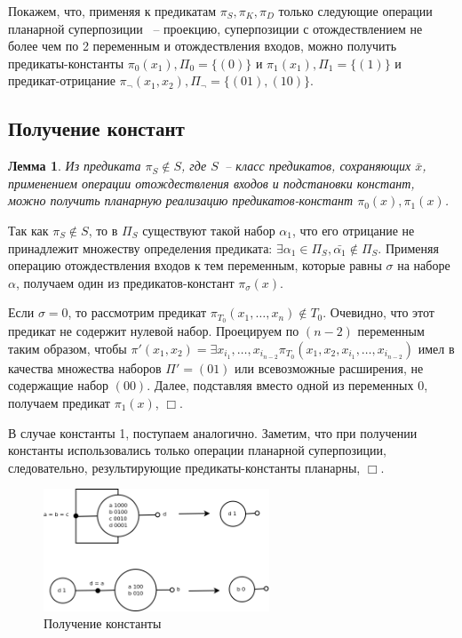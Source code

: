 \documentclass[12pt]{article}
\newtheorem{lemma}[theorem]{Лемма}
\newenvironment{proof}[1][Доказательство]{\begin{trivlist}
\item[\hskip \labelsep {\bfseries #1}]}{\end{trivlist}}
\begin{document}
Покажем, что, применяя к предикатам $\pi_S, \pi_K, \pi_D$ только следующие операции планарной суперпозиции ~-- проекцию,
суперпозиции с отождествлением не более чем по 2 переменным и отождествления входов, 
можно получить предикаты-константы
$\pi_0(x_1), \Pi_0=\{ (0) \}$ и $\pi_1(x_1), \Pi_1=\{ (1) \}$ и предикат-отрицание 
$\pi_{\neg}(x_1, x_2), \Pi_{\neg}=\{ (01), (10) \}$.

\subsection{Получение констант}
\begin{lemma}
\label{eq:const}
Из предиката $\pi_S \notin S$, где $S$~-- класс предикатов, сохраняющих $\bar{x}$, 
применением операции отождествления входов и подстановки констант,
можно получить планарную реализацию предикатов-констант $\pi_0(x), \pi_1(x)$.
\end{lemma}

\begin{proof}
Так как $\pi_S \notin S$, то в $\Pi_S$ существуют такой набор
$\alpha_1$, что его отрицание не принадлежит множеству определения предиката:
$\exists \alpha_1 \in \Pi_S, \bar{\alpha_1} \notin \Pi_S$.
Применяя операцию отождествления входов к тем переменным, которые равны $\sigma$ на наборе $\alpha$,
получаем один из предикатов-констант $\pi_{\sigma}(x)$.

Если $\sigma = 0$, то рассмотрим предикат 
$\pi_{T_0}(x_1, \dots, x_n) \notin T_0$. Очевидно, что этот предикат не содержит нулевой набор. 
Проецируем по $(n-2)$ переменным таким образом, чтобы 
$\pi'(x_1, x_2) = \exists {x_{i_1}, \dots, x_{i_{n-2}}} \pi_{T_0}(x_1, x_2, x_{i_1}, \dots, x_{i_{n-2}})$
имел в качества множества наборов $\Pi' = { (01) }$ или всевозможные расширения, не содержащие набор $(00)$.
Далее, подставляя вместо одной из переменных 0, получаем предикат $\pi_1(x)$, $\Box$. 

В случае константы 1, поступаем аналогично. 
Заметим, что при получении константы использовались только операции планарной суперпозиции, следовательно, 
результирующие предикаты-константы планарны, $\Box$.
\end{proof}
\begin{figure}[htb]
\centering
\includegraphics[width=0.6\textwidth]{const.png}
\caption{Получение константы}
\label{fig:constant}
\end{figure}
\end{document}
